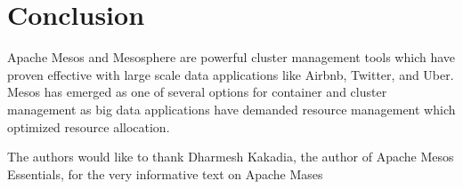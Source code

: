 \section{Conclusion}

Apache Mesos and Mesosphere are powerful cluster management tools which have proven effective with large scale data applications like Airbnb, Twitter, and Uber. Mesos has emerged as one of several options for container and cluster management as big data applications have demanded resource management which optimized resource allocation. 


\begin{acks}

  The authors would like to thank Dharmesh Kakadia, the author of Apache Mesos Essentials, for the very informative text on Apache Mases

\end{acks}


 


